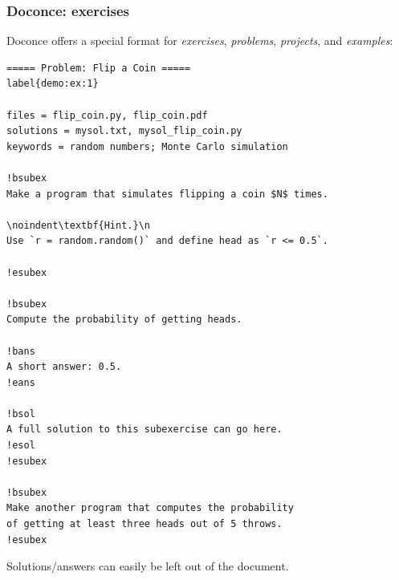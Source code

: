 \documentclass{beamer}
\begin{document}
\begin{frame}
\frametitle{Doconce: exercises}

Doconce offers a special format for \emph{exercises}, \emph{problems}, \emph{projects},
and \emph{examples}:

\begin{Verbatim}[numbers=none,fontsize=\fontsize{9pt}{9pt},baselinestretch=0.95]
===== Problem: Flip a Coin =====
label{demo:ex:1}

files = flip_coin.py, flip_coin.pdf
solutions = mysol.txt, mysol_flip_coin.py
keywords = random numbers; Monte Carlo simulation

!bsubex
Make a program that simulates flipping a coin $N$ times.

\noindent\textbf{Hint.}\n
Use `r = random.random()` and define head as `r <= 0.5`.

!esubex

!bsubex
Compute the probability of getting heads.

!bans
A short answer: 0.5.
!eans

!bsol
A full solution to this subexercise can go here.
!esol
!esubex

!bsubex
Make another program that computes the probability
of getting at least three heads out of 5 throws.
!esubex
\end{Verbatim}

Solutions/answers can easily be left out of the document.
\end{frame}
\end{document}
